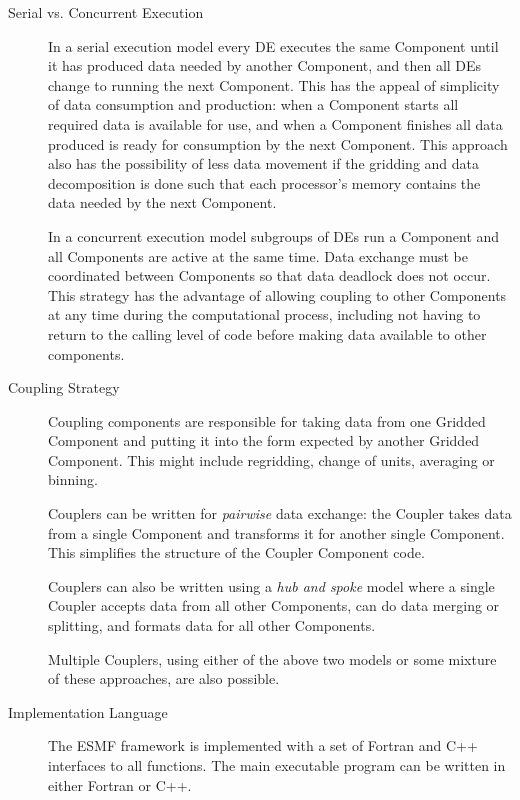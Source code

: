\begin{description}

\item[Serial vs. Concurrent Execution]

In a serial execution model every DE executes the same Component 
until it has produced data needed by another Component, and then 
all DEs change to
running the next Component.  This has the appeal of simplicity
of data consumption and production: when a Component starts
all required data is available for use, and when a Component finishes
all data produced is ready for consumption by the next Component. 
This approach also has
the possibility of less data movement if the gridding and
data decomposition is done such that each processor's memory contains
the data needed by the next Component.

In a concurrent execution model subgroups of DEs run
a Component and all Components are active at the same time.  
Data exchange must be coordinated between Components so that
data deadlock does not occur.  This strategy has the advantage
of allowing coupling to other Components at any time during
the computational process, including not having to return to
the calling level of code before making data available to 
other components.

\item[Coupling Strategy]

Coupling components are responsible for taking data from one
Gridded Component and putting it into the form expected by another 
Gridded Component.
This might include regridding, change of units, averaging or binning.

Couplers can be written for {\it pairwise} data exchange: the Coupler takes
data from a single Component and transforms it for another single Component.
This simplifies the structure of the Coupler Component code.

Couplers can also be written using a {\it hub and spoke} model where a
single Coupler accepts data from all other Components, can do data
merging or splitting, and formats data for all other Components.

Multiple Couplers, using either of the above two models or some mixture of
these approaches, are also possible.

\item[Implementation Language]

The ESMF framework is implemented with a set of Fortran and C++ interfaces
to all functions.  The main executable program can be written in either
Fortran or C++.


\end{description}
